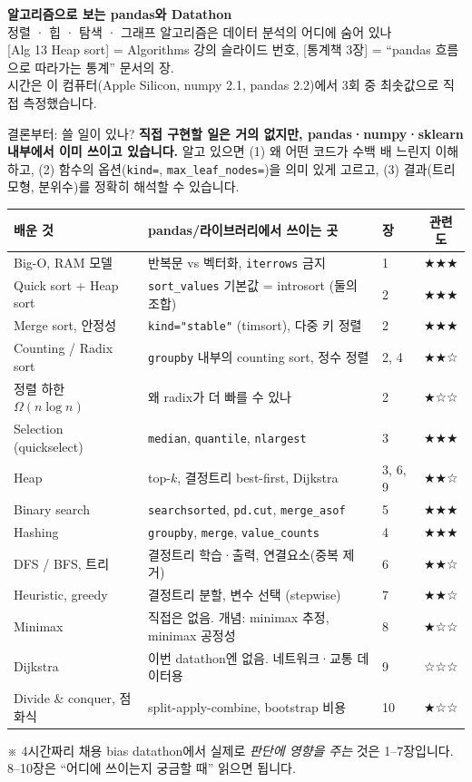 \documentclass[11pt,a4paper]{article}
\newcommand{\code}[1]{\texttt{#1}}
\newcommand{\aref}[1]{{\footnotesize\textsf{\color{blue!55!black}[Alg #1]}}}
\newcommand{\sref}[1]{{\footnotesize\textsf{\color{green!40!black}[통계책 #1]}}}
\newcommand{\aside}[1]{{\footnotesize\color{black!65}#1}}
\begin{document}
\begin{center}
{\LARGE\textbf{알고리즘으로 보는 pandas와 Datathon}}\\[0.4em]
{\large 정렬 · 힙 · 탐색 · 그래프 알고리즘은 데이터 분석의 어디에 숨어 있나}\\[0.3em]
{\small \aref{13 Heap sort} = Algorithms 강의 슬라이드 번호, \sref{3장} = ``pandas 흐름으로 따라가는 통계'' 문서의 장.\\
시간은 이 컴퓨터(Apple Silicon, numpy 2.1, pandas 2.2)에서 3회 중 최솟값으로 직접 측정했습니다.}
\end{center}

\vspace{0.6em}
\begin{keybox}{결론부터: 쓸 일이 있나?}
\textbf{직접 구현할 일은 거의 없지만, pandas·numpy·sklearn 내부에서 이미 쓰이고 있습니다.} 알고 있으면 (1) 왜 어떤 코드가 수백 배 느린지 이해하고, (2) 함수의 옵션(\code{kind=}, \code{max\_leaf\_nodes=})을 의미 있게 고르고, (3) 결과(트리 모형, 분위수)를 정확히 해석할 수 있습니다.
\begin{center}\small
\begin{tabular}{@{}l l l c@{}}
\toprule
배운 것 & pandas/라이브러리에서 쓰이는 곳 & 장 & 관련도 \\
\midrule
Big-O, RAM 모델 & 반복문 vs 벡터화, \code{iterrows} 금지 & 1 & ★★★ \\
Quick sort + Heap sort & \code{sort\_values} 기본값 = introsort (둘의 조합) & 2 & ★★★ \\
Merge sort, 안정성 & \code{kind="stable"} (timsort), 다중 키 정렬 & 2 & ★★★ \\
Counting / Radix sort & \code{groupby} 내부의 counting sort, 정수 정렬 & 2, 4 & ★★☆ \\
정렬 하한 $\Omega(n\log n)$ & 왜 radix가 더 빠를 수 있나 & 2 & ★☆☆ \\
Selection (quickselect) & \code{median}, \code{quantile}, \code{nlargest} & 3 & ★★★ \\
Heap & top-$k$, 결정트리 best-first, Dijkstra & 3, 6, 9 & ★★☆ \\
Binary search & \code{searchsorted}, \code{pd.cut}, \code{merge\_asof} & 5 & ★★★ \\
Hashing & \code{groupby}, \code{merge}, \code{value\_counts} & 4 & ★★★ \\
DFS / BFS, 트리 & 결정트리 학습·출력, 연결요소(중복 제거) & 6 & ★★☆ \\
Heuristic, greedy & 결정트리 분할, 변수 선택 (stepwise) & 7 & ★★☆ \\
Minimax & 직접은 없음. 개념: minimax 추정, minimax 공정성 & 8 & ★☆☆ \\
Dijkstra & 이번 datathon엔 없음. 네트워크·교통 데이터용 & 9 & ☆☆☆ \\
Divide \& conquer, 점화식 & split-apply-combine, bootstrap 비용 & 10 & ★☆☆ \\
\bottomrule
\end{tabular}
\end{center}
\aside{※ 4시간짜리 채용 bias datathon에서 실제로 \emph{판단에 영향을 주는} 것은 1–7장입니다. 8–10장은 ``어디에 쓰이는지 궁금할 때'' 읽으면 됩니다.}
\end{keybox}
\end{document}
